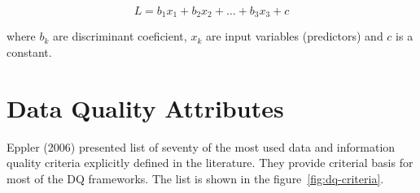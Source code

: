 \begin{equation*}
    L = b_1 x_1 + b_2 x_2 + \ldots + b_3 x_3 + c
\end{equation*}

where \( b_k \) are discriminant coeficient, \( x_k \) are input variables (predictors) and \( c \) is a constant.

\section{Data Quality Attributes}\label{sec:data-quality-attributes}

Eppler (2006) presented list of seventy of the most used data and information quality criteria explicitly defined in the literature.
They provide criterial basis for most of the DQ frameworks.
The list is shown in the figure~\ref{fig:dq-criteria}.

